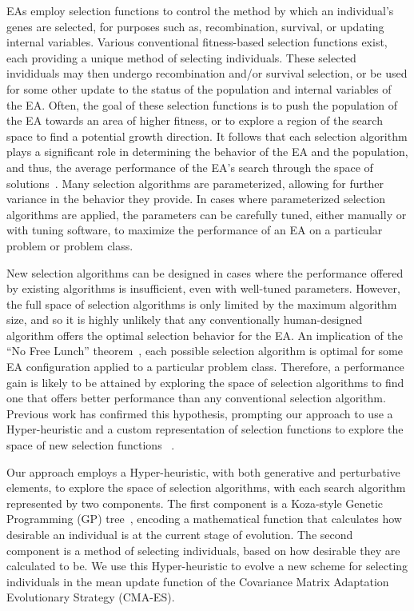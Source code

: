 \documentclass[sigconf]{acmart}
\begin{document}
EAs employ selection functions to control the method by which an individual's genes are selected, for purposes such as, recombination, survival, or updating internal variables. Various conventional fitness-based selection functions exist, each providing a unique method of selecting individuals. These selected invididuals may then undergo recombination and/or survival selection, or be used for some other update to the status of the population and internal variables of the EA. Often, the goal of these selection functions is to push the population of the EA towards an area of higher fitness, or to explore a region of the search space to find a potential growth direction. It follows that each selection algorithm plays a significant role in determining the behavior of the EA and the population, and thus, the average performance of the EA's search through the space of solutions~\citep{woodward2010metaBias}. Many selection algorithms are parameterized, allowing for further variance in the behavior they provide. In cases where parameterized selection algorithms are applied, the parameters can be carefully tuned, either manually or with tuning software, to maximize the performance of an EA on a particular problem or problem class.

New selection algorithms can be designed in cases where the performance offered by existing algorithms is insufficient, even with well-tuned parameters. However, the full space of selection algorithms is only limited by the maximum algorithm size, and so it is highly unlikely that any conventionally human-designed algorithm offers the optimal selection behavior for the EA. An implication of the ``No Free Lunch'' theorem~\citep{wolpert1995noFreeLunch}, each possible selection algorithm is optimal for some EA configuration applied to a particular problem class. Therefore, a performance gain is likely to be attained by exploring the space of selection algorithms to find one that offers better performance than any conventional selection algorithm. Previous work has confirmed this hypothesis, prompting our approach to use a Hyper-heuristic and a custom representation of selection functions to explore the space of new selection functions ~\citep{woodward2011selection}.

Our approach employs a Hyper-heuristic, with both generative and perturbative elements, to explore the space of selection algorithms, with each search algorithm represented by two components. The first component is a Koza-style Genetic Programming (GP) tree~\citep{koza1994genetic}, encoding a mathematical function that calculates how desirable an individual is at the current stage of evolution. The second component is a method of selecting individuals, based on how desirable they are calculated to be. We use this Hyper-heuristic to evolve a new scheme for selecting individuals in the mean update function of the Covariance Matrix Adaptation Evolutionary Strategy (CMA-ES).
\end{document}
